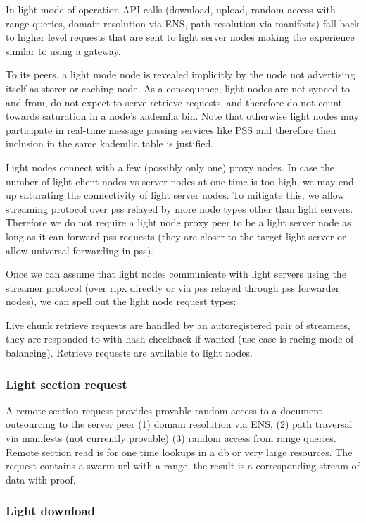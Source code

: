 In light mode of operation API calls (download, upload, random access with range queries, domain resolution via ENS, path resolution via manifests) fall back to higher level requests that are sent to light server nodes making the experience similar to using a gateway.

To its peers, a light mode node is revealed implicitly by the node not advertising itself as storer or caching node.
As a consequence, light nodes are not synced to and from, do not expect to serve retrieve requests, and therefore do not count towards saturation in a node's kademlia bin.
Note that otherwise light nodes may participate in real-time message passing services like PSS and therefore their inclusion in the same kademlia table is justified.

Light nodes connect with a few (possibly only one) proxy nodes.
In case the number of light client nodes vs server nodes at one time is too high, we may end up saturating the connectivity of light server nodes. To mitigate this,
we allow streaming protocol over pss relayed by more node types other than light servers.
Therefore we do not require a light node proxy peer to be a light server node as long as it can forward pss requests (they are closer to the target light server or allow universal forwarding in pss).

Once we can assume that light nodes communicate with light servers using the streamer protocol (over rlpx directly or via pss relayed through pss forwarder nodes), we can spell out the light node request types:

Live chunk retrieve requests are handled by an autoregistered pair of streamers, they are responded to with hash checkback if wanted (use-case is racing mode of balancing). Retrieve requests are available to light nodes.

\subsubsection{Light section request}

A remote section request provides provable random access to a document outsourcing to the server peer (1) domain resolution via ENS, (2) path traversal via manifests (not currently provable) (3) random access from range queries. 
Remote section read is for one time lookups in a db or very large resources.
The request contains a swarm url with a range, the result is a corresponding stream of data  with proof.

\subsubsection{Light download}

